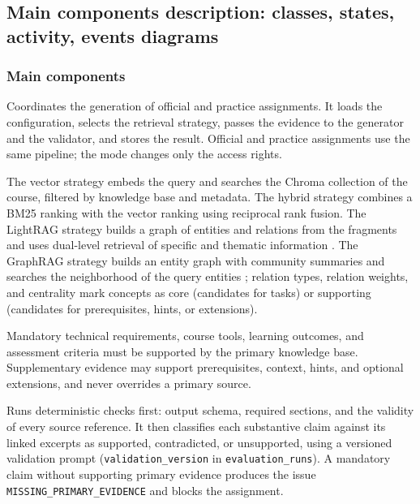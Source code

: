 \documentclass[12pt,a4paper]{article}
\begin{document}
\subsection{Main components description: classes, states, activity, events diagrams}
\label{sec:architecture-components}

\subsubsection*{Main components}

\begin{description}[style=nextline,leftmargin=0pt,labelindent=0pt]

\item[Assignment service]
Coordinates the generation of official and practice assignments. It
loads the configuration, selects the retrieval strategy, passes the
evidence to the generator and the validator, and stores the result.
Official and practice assignments use the same pipeline; the mode
changes only the access rights.

\item[Retrieval strategies]
The vector strategy embeds the query and searches the Chroma
collection of the course, filtered by knowledge base and metadata.
The hybrid strategy combines a BM25 ranking with the vector ranking
using reciprocal rank fusion. The LightRAG strategy builds a graph of
entities and relations from the fragments and uses dual-level
retrieval of specific and thematic information
\cite{guo2024lightrag}. The GraphRAG strategy builds an entity graph
with community summaries and searches the neighborhood of the query
entities \cite{edge2024graphrag}; relation types, relation weights,
and centrality mark concepts as core (candidates for tasks) or
supporting (candidates for prerequisites, hints, or extensions).

\item[Source-authority policy]
Mandatory technical requirements, course tools, learning outcomes,
and assessment criteria must be supported by the primary knowledge
base. Supplementary evidence may support prerequisites, context,
hints, and optional extensions, and never overrides a primary
source.

\item[Evidence validator]
Runs deterministic checks first: output schema, required sections,
and the validity of every source reference. It then classifies each
substantive claim against its linked excerpts as supported,
contradicted, or unsupported, using a versioned validation prompt
(\texttt{validation\_version} in \texttt{evaluation\_runs}). A
mandatory claim without supporting primary evidence produces the
issue \texttt{MISSING\_PRIMARY\_EVIDENCE} and blocks the assignment.


\end{description}
\end{document}
